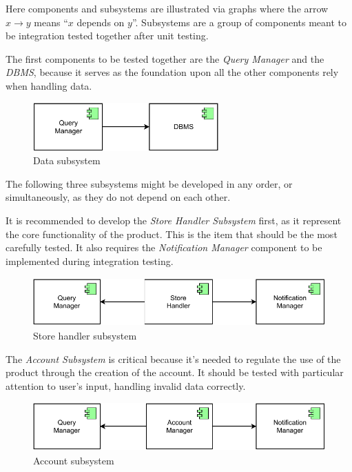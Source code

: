 Here components and subsystems are illustrated via graphs where the arrow $x \longrightarrow y$ means ``$x$ depends on $y$''. Subsystems are a group of components meant to be integration tested together after unit testing.

The first components to be tested together are the \emph{Query Manager} and the \emph{DBMS}, because it serves as the foundation upon all the other components rely when handling data.

\begin{figure}[H]
    \centering
    \includegraphics[height=5em]{images/draw.io/data_subsystem.pdf}
    \caption{Data subsystem}
    \label{fig:data_subsystem}
\end{figure}

The following three subsystems might be developed in any order, or simultaneously, as they do not depend on each other.

It is recommended to develop the \emph{Store Handler Subsystem} first, as it represent the core functionality of the product. This is the item that should be the most carefully tested. It also requires the \emph{Notification Manager} component to be implemented during integration testing.

\begin{figure}[H]
    \centering
    \includegraphics[height=5em]{images/draw.io/store_handler_subsystem.pdf}
    \caption{Store handler subsystem}
    \label{fig:store_handler_subsystem}
\end{figure}

The \emph{Account Subsystem} is critical because it's needed to regulate the use of the product through the creation of the account. It should be tested with particular attention to user's input, handling invalid data correctly.

\begin{figure}[H]
    \centering
    \includegraphics[height=5em]{images/draw.io/account_subsystem.pdf}
    \caption{Account subsystem}
    \label{fig:account_subsystem}
\end{figure}

